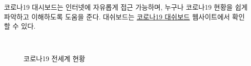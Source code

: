 \documentclass[
  letterpaper,
]{book}
\begin{document}
코로나19 대시보드는 인터넷에 자유롭게 접근 가능하며, 누구나 코로나19
현황을 쉽게 파악하고 이해하도록 도움을 준다. 대쉬보드는
\href{https://statkclee.github.io/comp_document/cd-corona.html}{코로나19
대쉬보드} 웹사이트에서 확인할 수 있다.

\begin{figure}

\begin{minipage}[t]{0.49\linewidth}

{\centering 


\caption{코로나19 전세계 현황}

}

\end{minipage}%
%
\begin{minipage}[t]{0.01\linewidth}

{\centering 

~

}

\end{minipage}%
%
\begin{minipage}[t]{0.49\linewidth}

{\centering 

}
\end{minipage}
\end{figure}
\end{document}
